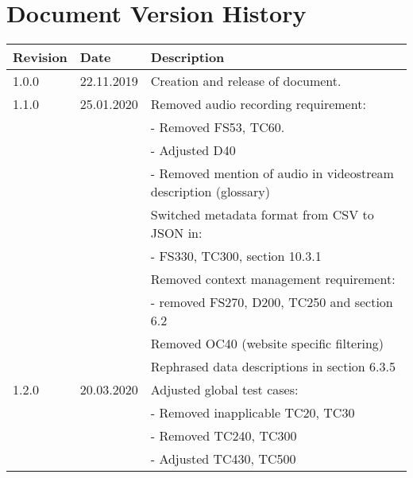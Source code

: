 \chapter*{Document Version History}
\label{ch:versionhistory}
\begin{table}[h]
\begin{tabular}{lll}
\textbf{Revision} & \textbf{Date} & \textbf{Description}              \\
\hline
1.0.0             & 22.11.2019    & Creation and release of document. \\
\hline
1.1.0             & 25.01.2020    & Removed audio recording requirement: \\
&& - Removed FS53, TC60. \\
&& - Adjusted D40 \\
&& - Removed mention of audio in \gls{videostream} description (glossary) \\
&& Switched metadata format from CSV to JSON in:\\
&& - FS330, TC300, section 10.3.1 \\
&& Removed context management requirement:\\
&& - removed FS270, D200, TC250 and section 6.2\\
&& Removed OC40 (website specific filtering)\\
&& Rephrased data descriptions in section 6.3.5\\
\hline
1.2.0           & 20.03.2020    & Adjusted global test cases: \\
&& - Removed inapplicable TC20, TC30\\
&& - Removed TC240, TC300\\
&& - Adjusted TC430, TC500\\
\end{tabular}
\end{table}